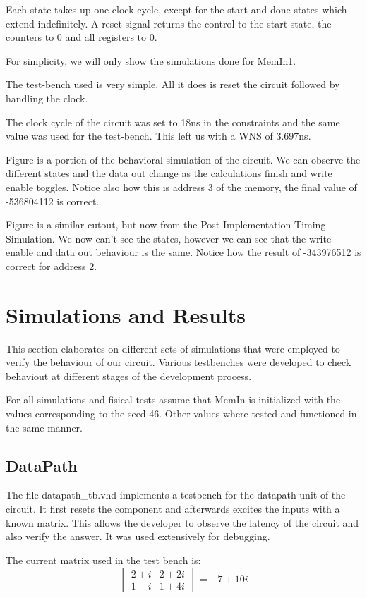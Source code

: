 \documentclass[12pt]{article}
\begin{document}
Each state takes up one clock cycle, except for the start and done states which extend indefinitely. A reset signal returns the control to the start state, the counters to 0 and all registers to 0.


For simplicity, we will only show the simulations done for MemIn1.

The test-bench used is very simple. All it does is reset the circuit followed by handling the clock.

The clock cycle of the circuit was set to 18ns in the constraints and the same value was used for the test-bench. This left us with a WNS of 3.697ns.


Figure is a portion of the behavioral simulation of the circuit. We can observe the different states and the data out change as the calculations finish and write enable toggles. Notice also how this is address 3 of the memory, the final value of -536804112 is correct.


Figure is a similar cutout, but now from the Post-Implementation Timing Simulation. We now can't see the states, however we can see that the write enable and data out behaviour is the same. Notice how the result of -343976512 is correct for address 2.

\section{Simulations and Results}
This section elaborates on different sets of simulations that were employed to verify the behaviour of our circuit. Various testbenches were developed to check behaviout at different stages of the development process.

For all simulations and fisical tests assume that MemIn is initialized with the values corresponding to the seed 46. Other values where tested and functioned in the same manner.
\subsection{DataPath}
The file datapath\_tb.vhd implements a testbench for the datapath unit of the circuit. 
It first resets the component and afterwards excites the inputs with a known matrix. This allows the developer to observe the latency of the circuit and also verify the answer. It was used extensively for debugging. 

The current matrix used in the test bench is:
\begin{equation*}
	\begin{vmatrix} 2+i & 2+2i \\ 
					1-i & 1+4i 
	\end{vmatrix} 
	= -7 + 10i
\end{equation*}
\end{document}
